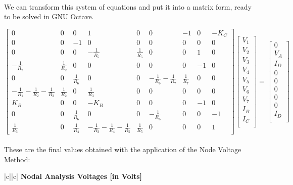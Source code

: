 \paragraph{}
We can transform this system of equations and put it into a matrix form, ready to be solved in GNU Octave.

\[
\begin{bmatrix}
0 & 0 & 0 & 1 & 0 & 0 & -1 & 0 & -K_C\\
0 & 0 & -1 & 0 & 0 & 0 & 0 & 0 & 0\\ 
0 & 0 & 0 & -\frac{1}{R_5} & \frac{1}{R_5} & 0 & 0 & 1 & 0\\
-\frac{1}{R_2} & \frac{1}{R_2} & 0 & 0 & 0 & 0 & 0 & -1 & 0\\
0 & 0 & \frac{1}{R_6} & 0 & 0 & -\frac{1}{R_6}-\frac{1}{R_7}&\frac{1}{R_7} & 0 & 0\\ 
-\frac{1}{R_1}-\frac{1}{R_2}-\frac{1}{R_3} & \frac{1}{R_2} & 0 & \frac{1}{R_3} & 0 & 0 & 0 & 0 & 0\\ 
K_B & 0 & 0 & -K_B & 0 & 0 & 0 & -1 & 0\\ 
0 & 0 & \frac{1}{R_6} & 0 & 0 & -\frac{1}{R_6} & 0 & 0 & -1\\ 
\frac{1}{R_3} & 0 & \frac{1}{R_4} & -\frac{1}{R_3}-\frac{1}{R_4}-\frac{1}{R_5} & \frac{1}{R_5} & 0 & 0 & 0 & 1
\end{bmatrix}
\begin{bmatrix}
V_1\\
V_2\\
V_3\\
V_4\\
V_5\\
V_6\\
V_7\\
I_B\\
I_C\\
\end{bmatrix}
=
\begin{bmatrix}
0\\
V_A\\
I_D\\
0\\
0\\
0\\
0\\
0\\
I_D\\
\end{bmatrix}
\]

\paragraph{}
These are the final values obtained with the application of the Node Voltage Method:
\begin{center}
   \begin{tabular}{|c||c|}
      \hline    
       {\bf Nodal Analysis Voltages [in Volts]} \\
      \hline

        
   \end{tabular}
 
\end{center}   
